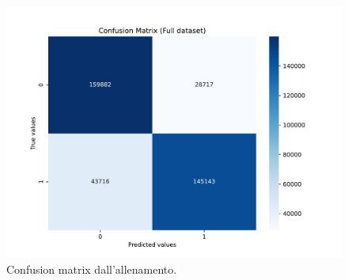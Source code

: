         \begin{figure}[h]
            \centering
            \includegraphics[width=0.7\linewidth]{res/fig/3-chapter/6-confusion-matrix.pdf}
            \caption{Confusion matrix dall'allenamento.}
            \label{fig:confusion-matrix}
        \end{figure}

\newpage

